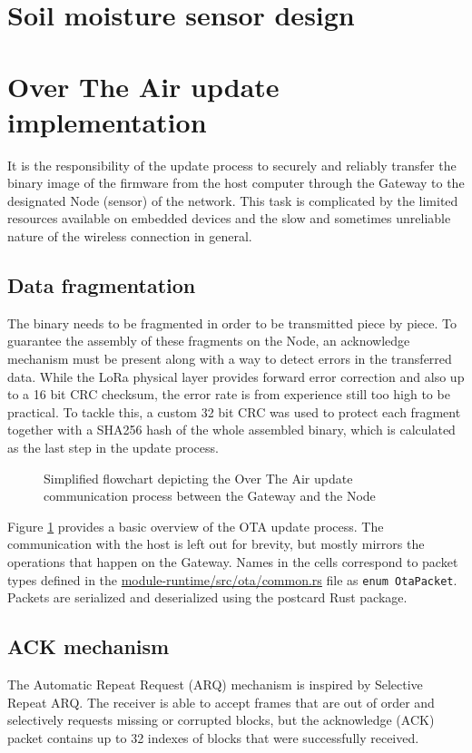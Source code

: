 \section{Soil moisture sensor design}

\section{Over The Air update implementation}
It is the responsibility of the update process to securely and reliably transfer the binary image of the firmware from the host computer through the Gateway to the designated Node (sensor) of the network. This task is complicated by the limited resources available on embedded devices and the slow and sometimes unreliable nature of the wireless connection in general.

\subsection{Data fragmentation}
The binary needs to be fragmented in order to be transmitted piece by piece. To guarantee the assembly of these fragments on the Node, an acknowledge mechanism must be present along with a way to detect errors in the transferred data. While the LoRa physical layer provides forward error correction and also up to a 16 bit CRC checksum, the error rate is from experience still too high to be practical. To tackle this, a custom 32 bit CRC was used to protect each fragment together with a SHA256 hash of the whole assembled binary, which is calculated as the last step in the update process.

\begin{figure}[p]
    
    \caption{\label{fig:ota-algo}Simplified flowchart depicting the Over The Air update communication process between the Gateway and the Node}
\end{figure}

Figure \ref{fig:ota-algo} provides a basic overview of the OTA update process. The communication with the host is left out for brevity, but mostly mirrors the operations that happen on the Gateway. Names in the cells correspond to packet types defined in the \href{https://github.com/manakjiri/lora-module-fw/blob/main/module-runtime/src/ota/common.rs}{module-runtime/src/ota/common.rs} file as \lstinline|enum OtaPacket|. Packets are serialized and deserialized using the postcard Rust package.

\subsection{ACK mechanism}
The Automatic Repeat Request (ARQ) mechanism is inspired by Selective Repeat ARQ. The receiver is able to accept frames that are out of order and selectively requests missing or corrupted blocks, but the acknowledge (ACK) packet contains up to 32 indexes of blocks that were successfully received. 

